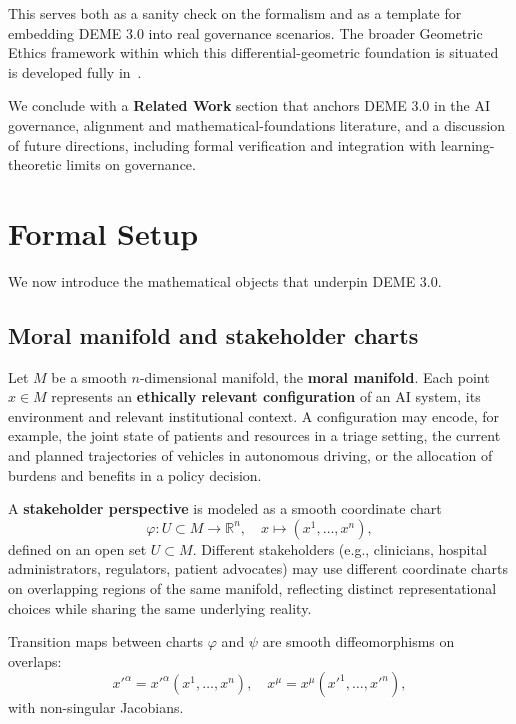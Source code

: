 \documentclass[12pt]{article}
\theoremstyle{remark}
\begin{document}
This serves both as a sanity check on the formalism and as a template for embedding DEME 3.0 into real governance scenarios. The broader Geometric Ethics framework within which this differential-geometric foundation is situated is developed fully in~\cite{bond2026ge}.

We conclude with a \textbf{Related Work} section that anchors DEME 3.0 in the AI governance, alignment and mathematical-foundations literature, and a discussion of future directions, including formal verification and integration with learning-theoretic limits on governance.

\section{Formal Setup}

We now introduce the mathematical objects that underpin DEME 3.0.

\subsection{Moral manifold and stakeholder charts}

Let $M$ be a smooth $n$-dimensional manifold, the \textbf{moral manifold}. Each point $x \in M$ represents an \textbf{ethically relevant configuration} of an AI system, its environment and relevant institutional context. A configuration may encode, for example, the joint state of patients and resources in a triage setting, the current and planned trajectories of vehicles in autonomous driving, or the allocation of burdens and benefits in a policy decision.

A \textbf{stakeholder perspective} is modeled as a smooth coordinate chart
\begin{equation}
    \varphi\colon U \subset M \to \mathbb{R}^n,\quad x \mapsto (x^1, \dots, x^n),
\end{equation}
defined on an open set $U \subset M$. Different stakeholders (e.g., clinicians, hospital administrators, regulators, patient advocates) may use different coordinate charts on overlapping regions of the same manifold, reflecting distinct representational choices while sharing the same underlying reality.

Transition maps between charts $\varphi$ and $\psi$ are smooth diffeomorphisms on overlaps:
\begin{equation}
    x'^{\alpha} = x'^{\alpha}(x^1, \dots, x^n),\quad x^{\mu} = x^{\mu}(x'^{1}, \dots, x'^{n}),
\end{equation}
with non-singular Jacobians.
\end{document}
